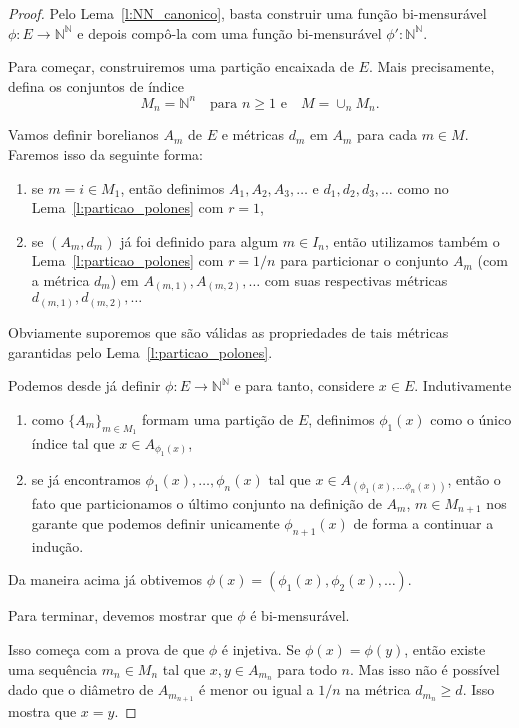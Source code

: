 \documentclass[reqno, final]{book}
\newcommand*\1{\mathds{1}}
\begin{document}
\begin{proof}
  Pelo Lema~\ref{l:NN_canonico}, basta construir uma função bi-mensurável $\phi:E \to \mathbb{N}^\mathbb{N}$ e depois compô-la com uma função bi-mensurável $\phi':\mathbb{N}^\mathbb{N}$.

  Para começar, construiremos uma partição encaixada de $E$.
  Mais precisamente, defina os conjuntos de índice
  \begin{equation}
    M_n = \mathbb{N}^n \quad \text{para $n \geq 1$ e} \quad M = \cup_n M_n.
  \end{equation}

  Vamos definir borelianos $A_m$ de $E$ e métricas $d_m$ em $A_m$ para cada $m \in M$.
  Faremos isso da seguinte forma:
  \begin{enumerate}[\quad a)]
  \item se $m = i \in M_1$, então definimos $A_1, A_2, A_3, \dots$ e $d_1, d_2, d_3, \dots$ como no Lema~\ref{l:particao_polones} com $r = 1$,
  \item se $(A_m, d_m)$ já foi definido para algum $m \in I_n$, então utilizamos também o Lema~\ref{l:particao_polones} com $r = 1/n$ para particionar o conjunto $A_m$ (com a métrica $d_m$) em $A_{(m,1)}, A_{(m,2)}, \dots$ com suas respectivas métricas $d_{(m,1)}, d_{(m,2)}, \dots$
  \end{enumerate}
  Obviamente suporemos que são válidas as propriedades de tais métricas garantidas pelo Lema~\ref{l:particao_polones}.

  Podemos desde já definir $\phi:E \to \mathbb{N}^\mathbb{N}$ e para tanto, considere $x \in E$.
  Indutivamente
  \begin{enumerate}[\quad a)]
  \item como $\{A_m\}_{m \in M_1}$ formam uma partição de $E$, definimos $\phi_1(x)$ como o único índice tal que $x \in A_{\phi_1(x)}$,
  \item se já encontramos $\phi_1(x), \dots, \phi_n(x)$ tal que $x \in A_{(\phi_1(x), \dots \phi_n(x))}$, então o fato que particionamos o último conjunto na definição de $A_m$, $m \in M_{n+1}$ nos garante que podemos definir unicamente $\phi_{n+1}(x)$ de forma a continuar a indução.
  \end{enumerate}
  Da maneira acima já obtivemos $\phi(x) = (\phi_1(x), \phi_2(x), \dots)$.

  Para terminar, devemos mostrar que $\phi$ é bi-mensurável.

  Isso começa com a prova de que $\phi$ é injetiva.
  Se $\phi(x) = \phi(y)$, então existe uma sequência $m_n \in M_n$ tal que $x, y \in A_{m_n}$ para todo $n$.
  Mas isso não é possível dado que o diâmetro de $A_{m_{n+1}}$ é menor ou igual a $1/n$ na métrica $d_{m_n} \geq d$.
  Isso mostra que $x = y$.


\end{proof}
\end{document}
